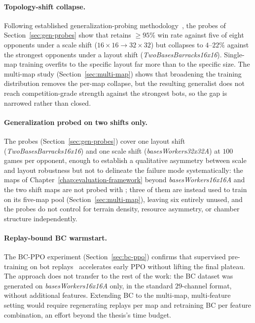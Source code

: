 \paragraph*{Topology-shift collapse.}
Following established generalization-probing methodology~\cite{korkmazSurveyAnalyzingGeneralization2024, wittyMeasuringCharacterizingGeneralization2018}, the probes of Section~\ref{sec:gen-probes} show that  retains $\geq 95\%$ win rate against five of eight opponents under a scale shift ($16{\times}16 \to 32{\times}32$) but collapses to $4$--$22$\% against the strongest opponents under a layout shift (\emph{TwoBasesBarracks16x16}). Single-map training overfits to the specific layout far more than to the specific size. The multi-map study (Section~\ref{sec:multi-map}) shows that broadening the training distribution removes the per-map collapse, but the resulting generalist does not reach competition-grade strength against the strongest bots, so the gap is narrowed rather than closed.

\paragraph*{Generalization probed on two shifts only.}
The probes (Section~\ref{sec:gen-probes}) cover one layout shift (\emph{TwoBasesBarracks16x16}) and one scale shift (\emph{basesWorkers32x32A}) at $100$ games per opponent, enough to establish a qualitative asymmetry between scale and layout robustness but not to delineate the failure mode systematically: the maps of Chapter~\ref{chap:evaluation-framework} beyond \emph{basesWorkers16x16A} and the two shift maps are not probed with ; three of them are instead used to train  on its five-map pool (Section~\ref{sec:multi-map}), leaving six entirely unused, and the probes do not control for terrain density, resource asymmetry, or chamber structure independently.

\paragraph*{Replay-bound BC warmstart.}
The BC-PPO experiment (Section~\ref{sec:bc-ppo}) confirms that supervised pre-training on bot replays~\cite{fosterBehaviorCloningAll2024} accelerates early PPO without lifting the final plateau. The approach does not transfer to the rest of the work: the BC dataset was generated on \emph{basesWorkers16x16A} only, in the standard $29$-channel format, without additional features. Extending BC to the multi-map, multi-feature setting would require regenerating replays per map and retraining BC per feature combination, an effort beyond the thesis's time budget.